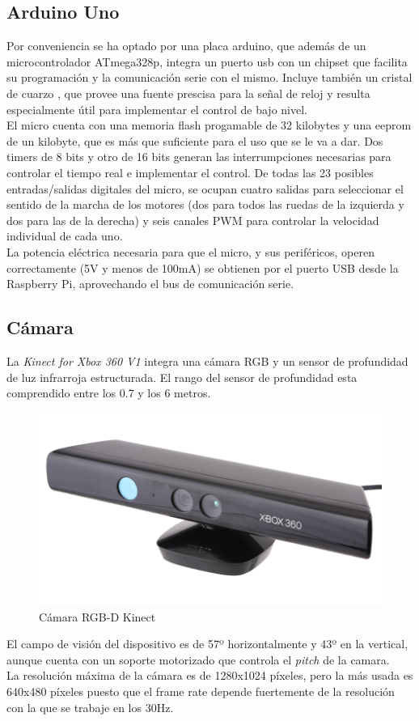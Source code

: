 \subsection{Arduino Uno}
Por conveniencia se ha optado por una placa arduino, que además de un microcontrolador ATmega328p, integra un puerto usb con un chipset que facilita su programación y la comunicación serie con el mismo. Incluye también un cristal de cuarzo , que provee una fuente prescisa para la señal de reloj y resulta especialmente útil para implementar el control de bajo nivel.\\
El micro cuenta con una memoria flash progamable de 32 kilobytes y una eeprom de un kilobyte, que es más que suficiente para el uso que se le va a dar. Dos timers de 8 bits y otro de 16 bits generan las interrumpciones necesarias para controlar el tiempo real e implementar el control. De todas las 23 posibles entradas/salidas digitales del micro, se ocupan cuatro salidas para seleccionar el sentido de la marcha de los motores (dos para todos las ruedas de la izquierda y dos para las de la derecha) y seis canales PWM para controlar la velocidad individual de cada uno.\\
La potencia eléctrica necesaria para que el micro, y sus periféricos, operen correctamente (5V y menos de 100mA) se obtienen por el puerto USB desde la Raspberry Pi, aprovechando el bus de comunicación serie.

\subsection{Cámara}
La \textit{Kinect for Xbox 360 V1} integra una cámara RGB y un sensor de profundidad de luz infrarroja estructurada. El rango del sensor de profundidad esta comprendido entre los 0.7 y los 6 metros.\\

\begin{figure}[h!]
	\centering
	\includegraphics[width=.4\textwidth]{images/kinect}
	\caption{Cámara RGB-D Kinect}
\end{figure}

El campo de visión del dispositivo es de 57º horizontalmente y 43º en la vertical, aunque cuenta con un soporte motorizado que controla el \textit{pitch} de la camara. \\
La resolución máxima de la cámara es de 1280x1024 píxeles, pero la más usada es 640x480 píxeles puesto que el frame rate depende fuertemente de la resolución con la que se trabaje en los 30Hz.\\

